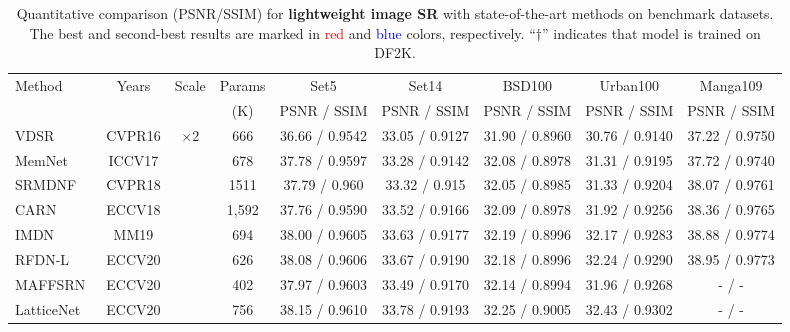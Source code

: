 \begin{table*}[t]
  \centering
  \footnotesize
  \setlength{\tabcolsep}{2.3mm}

    \caption{
    Quantitative comparison (PSNR/SSIM) for \textbf{lightweight image SR} with state-of-the-art methods on benchmark datasets. The best and second-best results are marked in \textcolor{red}{red} and \textcolor{blue}{blue} colors, respectively. ``$\dagger$” indicates that model is trained on DF2K.}
  \vspace{-3mm}
  \label{tab:psnr-ssim}
  \renewcommand{\arraystretch}{0.82}
	\begin{tabular}{l|c|c|c|c|c|c|c|c}
		\toprule[1pt]
		\multirow{2}{*}{Method} & \multirow{2}{*}{Years} & \multirow{2}{*}{Scale}  & Params & Set5 & Set14 & BSD100 & Urban100 & Manga109 \\
		&  & & (K) & PSNR / SSIM & PSNR / SSIM & PSNR / SSIM & PSNR / SSIM & PSNR / SSIM \\
    \hline
	VDSR~\cite{vdsr} &   CVPR16 & \multirow{13}{*}{$\times 2$} & 666 & 36.66 / 0.9542 & 33.05 / 0.9127 & 31.90 / 0.8960 & 30.76 / 0.9140 & 37.22 / 0.9750  \\
	
	MemNet~\cite{memnet} &  ICCV17 &  & 678 & 	37.78 / 0.9597 & 33.28 / 0.9142 & 32.08 / 0.8978 & 31.31 / 0.9195 & 37.72 / 0.9740\\
	
	SRMDNF~\cite{srmdnf} &  
	CVPR18 & & 1511 & 37.79 / 0.960 & 33.32 / 0.915 & 32.05 / 0.8985 & 31.33 / 0.9204 & 38.07 / 0.9761\\
	
	CARN~\cite{CARN} &  ECCV18&  & 1,592 & 37.76 / 0.9590 & 33.52 / 0.9166 & 32.09 / 0.8978 & 31.92 / 0.9256  & 38.36 / 0.9765 \\
		
    IMDN~\cite{imdn} &  MM19  && 694 & 38.00 / 0.9605 & 33.63 / 0.9177 & 32.19 / 0.8996 & 32.17 / 0.9283 & 38.88 / 0.9774 \\
    
    RFDN-L~\cite{liu2020residual}  &ECCV20 & & 626 & 38.08 / 0.9606 &  33.67 / 0.9190 & 32.18 / 0.8996 & 32.24 / 0.9290  & 38.95 / 0.9773 \\

    MAFFSRN~\cite{muqeet2020multi}  &ECCV20 && 402 & 37.97 / 0.9603 & 33.49 / 0.9170 & 32.14 / 0.8994 & 31.96 / 0.9268 &  - / -\\
    
    LatticeNet~\cite{latticenet}  &ECCV20  & & 756 & 38.15 / 0.9610 & 33.78 / 0.9193 & 32.25 / 0.9005 & 32.43 / 0.9302 & - / -\\
		

\end{tabular}
\end{table*}
